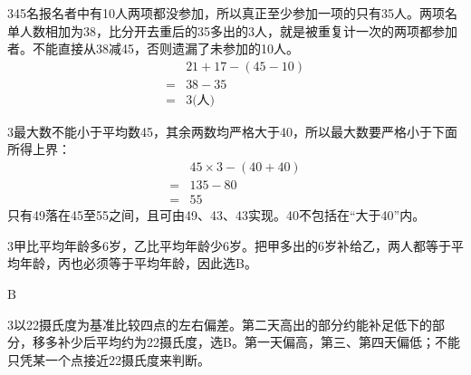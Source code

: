\documentclass[multi=snippet,border={5bp 20bp 5bp 5bp}]{standalone}
\newenvironment{snippet}[3]{\begin{minipage}{#1bp}\color{answerred}\fontsize{#2}{#3}\selectfont\raggedright}{\end{minipage}}
\begin{document}
\begin{snippet}{80}{12}{12.8}\SourceSans{}\end{snippet}
\begin{snippet}{200}{12}{12.8}\SourceSans{}\end{snippet}
\begin{snippet}{505}{11.5}{14}\begin{multicols}{3}\raggedcolumns 45名报名者中有10人两项都没参加，所以真正至少参加一项的只有35人。两项名单人数相加为38，比分开去重后的35多出的3人，就是被重复计一次的两项都参加者。不能直接从38减45，否则遗漏了未参加的10人。\[\begin{aligned}&21+17-(45-10)\\={}&38-35\\={}&3\text{(人)}\end{aligned}\]\end{multicols}\end{snippet}
\begin{snippet}{505}{11.5}{14}\begin{multicols}{3}\raggedcolumns 最大数不能小于平均数45，其余两数均严格大于40，所以最大数要严格小于下面所得上界：\[\begin{aligned}&45\times3-(40+40)\\={}&135-80\\={}&55\end{aligned}\]只有49落在45至55之间，且可由49、43、43实现。40不包括在“大于40”内。\end{multicols}\end{snippet}
\begin{snippet}{505}{11.5}{14}\begin{multicols}{3}\raggedcolumns 甲比平均年龄多6岁，乙比平均年龄少6岁。把甲多出的6岁补给乙，两人都等于平均年龄，丙也必须等于平均年龄，因此选B。\end{multicols}\end{snippet}
\begin{snippet}{22}{11.5}{12.8}\SourceSans\setlength{\mathindent}{2bp}\(\mathrm{B}\)\end{snippet}
\begin{snippet}{505}{11.5}{14}\begin{multicols}{3}\raggedcolumns 以22摄氏度为基准比较四点的左右偏差。第二天高出的部分约能补足低下的部分，移多补少后平均约为22摄氏度，选B。第一天偏高，第三、第四天偏低；不能只凭某一个点接近22摄氏度来判断。\end{multicols}\end{snippet}
\end{document}
